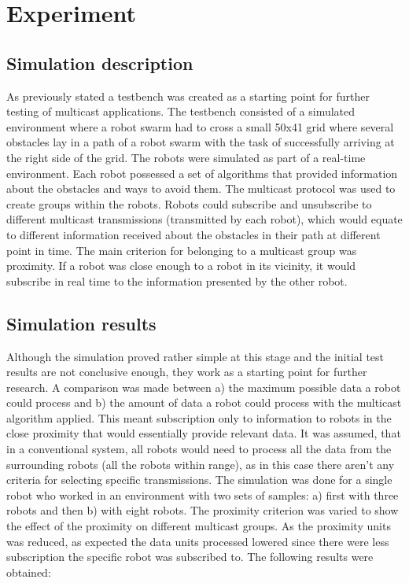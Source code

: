 \documentclass[journal]{IEEEtran}
\begin{document}
\section{Experiment}
\subsection{Simulation description}
As previously stated a testbench was created as a starting point for further testing of multicast applications.  The testbench consisted of a simulated environment where a robot swarm had to cross a small 50x41 grid where several obstacles lay in a path of a robot swarm with the task of successfully arriving at the right side of the grid. The robots were simulated as part of a real-time environment. Each robot possessed a set of algorithms that provided information about the obstacles and ways to avoid them. The multicast protocol was used to create groups within the robots.  Robots could subscribe and unsubscribe to different multicast transmissions (transmitted by each robot), which would equate to different information received about the obstacles in their path at different point in time. The main criterion for belonging to a multicast group was proximity. If a robot was close enough to a robot in its vicinity, it would subscribe in real time to the information presented by the other robot. 
\subsection{Simulation results}
Although the simulation proved rather simple at this stage and the initial test results are not conclusive enough, they work as a starting point for further research. A comparison was made between a) the maximum possible data a robot could process and b) the amount of data a robot could process with the multicast algorithm applied. This meant subscription only to information to robots in the close proximity that would essentially provide relevant data.  It was assumed, that in a conventional system, all robots would need to process all the data from the surrounding robots (all the robots within range), as in this case there aren’t any criteria for selecting specific transmissions. 
The simulation was done for a single robot who worked in an environment with two sets of samples: a) first with three robots and then b) with eight robots. The proximity criterion was varied to show the effect of the proximity on different multicast groups. As the proximity units was reduced, as expected the data units processed lowered since there were less subscription the specific robot was subscribed to.
The following results were obtained:
\end{document}
